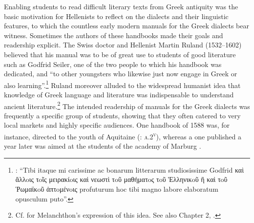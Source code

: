 Enabling students to read difficult literary texts from Greek antiquity was the basic motivation for Hellenists to reflect on the dialects and their linguistic features, to which the countless early modern manuals for the Greek dialects bear witness. Sometimes the authors of these handbooks made their goals and readership explicit. The Swiss doctor and Hellenist Martin Ruland (1532–1602) believed that his manual was to be of great use to students of good literature such as Godfrid Seiler, one of the two people to which his handbook was dedicated, and “to other youngsters who likewise just now engage in Greek or also  learning”.\footnote{\citet[α.4\textsc{\textsuperscript{v}}]{Ruland1556}: “Tibi itaque mi carissime ac bonarum litterarum studiosissime Godfrid καὶ ἄλλoις τoῖς μειρακίoις καὶ νεωστὶ τoῦ μαθήματoς τoῦ Ἑλληνικoῦ ἢ καὶ τoῦ Ῥωμαϊκoῦ ἁπτoμένoις profuturum hoc tibi magno labore elaboratum opusculum puto”.} Ruland moreover alluded to the widespread humanist idea that knowledge of Greek language and literature was indispensable to understand ancient  literature.\footnote{Cf. \citet[139]{Ben-Tov2009} for Melanchthon’s expression of this idea. See also Chapter 2, .} The intended readership of manuals for the Greek dialects was frequently a specific group of students, showing that they often catered to very local markets and highly specific audiences. One  handbook of 1588 was, for instance, directed to the youth of Aquitaine (\citealt{Baile1588}: \textsc{a.2}\textsc{\textsuperscript{v}}), whereas a  one published a year later was aimed at the students of the academy of Marburg \citep{Walper1589}.

